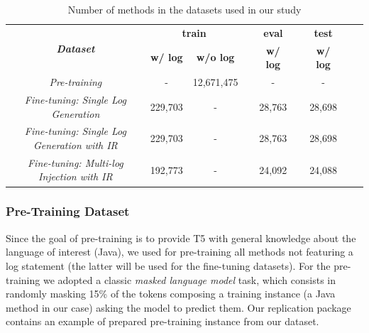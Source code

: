 \begin{table}[h]
	\centering
	\caption{Number of methods in the datasets used in our study}
		\label{tab:ds-summary-1}
	\begin{tabular}{ccccccccc}
		\toprule
		\multirow{2}{*}{\textit{\textbf{Dataset}}} & \multicolumn{2}{c}{\textbf{train}} & \textbf{} & \textbf{eval} & \textbf{} & \textbf{test}  \\ \cline{2-3} \cline{5-5} \cline{7-7} 
		& \textbf{w/ log} & \textbf{w/o log} & \textbf{} & \textbf{w/ log} & \textbf{} & \textbf{w/ log} \\ \midrule
		\textit{Pre-training}              & -               &      12,671,475  &           & -               &           &  -               \\
		\textit{Fine-tuning: Single Log Generation}               & 229,703         & -                &           & 28,763          &           & 28,698          \\
		\textit{Fine-tuning: Single Log Generation with IR}               & 229,703         & -                &           & 28,763          &           & 28,698          \\
		\textit{Fine-tuning: Multi-log Injection with IR}               & 192,773         & -                &           & 24,092         &           & 24,088          \\
		\bottomrule
	\end{tabular}
\end{table}

\subsubsection{Pre-Training Dataset}
\label{sub:pretraining}
Since the goal of pre-training is to provide T5 with general knowledge about the language of interest (\ie Java), we used for pre-training all methods not featuring a log statement (the latter will be used for the fine-tuning datasets). For the pre-training we adopted a classic \emph{masked language model} task, which consists in randomly masking 15\% of the tokens composing a training instance (\ie a Java method in our case) asking the model to predict them. 
Our replication package \cite{replication} contains an example of prepared pre-training instance from our dataset.


